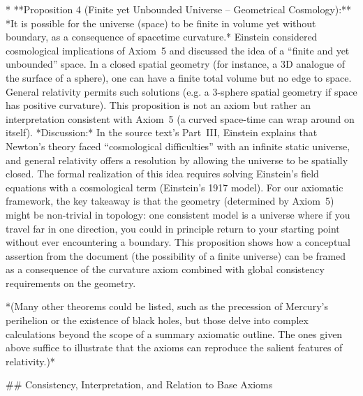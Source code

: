 \documentclass{article}
\begin{document}
* **Proposition 4 (Finite yet Unbounded Universe – Geometrical Cosmology):** *It is possible for the universe (space) to be finite in volume yet without boundary, as a consequence of spacetime curvature.* Einstein considered cosmological implications of Axiom 5 and discussed the idea of a “finite and yet unbounded” space. In a closed spatial geometry (for instance, a 3D analogue of the surface of a sphere), one can have a finite total volume but no edge to space. General relativity permits such solutions (e.g. a 3-sphere spatial geometry if space has positive curvature). This proposition is not an axiom but rather an interpretation consistent with Axiom 5 (a curved space-time can wrap around on itself). *Discussion:* In the source text’s Part III, Einstein explains that Newton’s theory faced “cosmological difficulties” with an infinite static universe, and general relativity offers a resolution by allowing the universe to be spatially closed. The formal realization of this idea requires solving Einstein’s field equations with a cosmological term (Einstein’s 1917 model). For our axiomatic framework, the key takeaway is that the geometry (determined by Axiom 5) might be non-trivial in topology: one consistent model is a universe where if you travel far in one direction, you could in principle return to your starting point without ever encountering a boundary. This proposition shows how a conceptual assertion from the document (the possibility of a finite universe) can be framed as a consequence of the curvature axiom combined with global consistency requirements on the geometry.

*(Many other theorems could be listed, such as the precession of Mercury’s perihelion or the existence of black holes, but those delve into complex calculations beyond the scope of a summary axiomatic outline. The ones given above suffice to illustrate that the axioms can reproduce the salient features of relativity.)*

## Consistency, Interpretation, and Relation to Base Axioms
\end{document}
